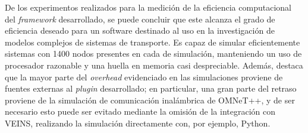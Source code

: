 De los experimentos realizados para la medición de la eficiencia computacional del \emph{framework} desarrollado, se puede concluir que este alcanza el grado de eficiencia deseado para un software destinado al uso en la investigación de modelos complejos de sistemas de transporte. Es capaz de simular eficientemente sistemas con 1400 nodos presentes en cada de simulación, manteniendo un uso de procesador razonable y una huella en memoria casi despreciable. 
\newpage
Además, destaca que la mayor parte del \emph{overhead} evidenciado en las simulaciones proviene de fuentes externas al \emph{plugin} desarrollado; en particular, una gran parte del retraso proviene de la simulación de comunicación inalámbrica de OMNeT++, y de ser necesario esto puede ser evitado mediante la omisión de la integración con VEINS, realizando la simulación directamente con, por ejemplo, Python.
